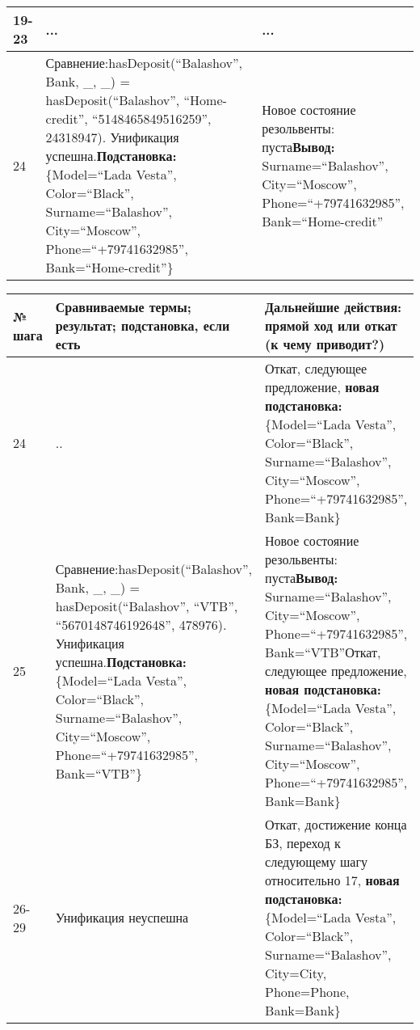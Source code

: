 \documentclass[14pt,a4paper]{scrreprt}
\begin{document}
\begin{enumerate}
\begin{table}[H]
\begin{tabular}{|p{1.2cm\small}|p{9cm\small}|p{5cm\small}|}
		\hline
		19-23 & ... & ...\\
		\hline
		24 & Сравнение:\linebreak hasDeposit(``Balashov'', Bank, \_, \_) = hasDeposit(``Balashov'', ``Home-credit'', ``5148465849516259'', 24318947). Унификация успешна.\linebreak \textbf{Подстановка:} \{Model=``Lada Vesta'', Color=``Black'', Surname=``Balashov'', City=``Moscow'', Phone=``+79741632985'', Bank=``Home-credit''\} & Новое состояние резольвенты: пуста\linebreak \textbf{Вывод:} Surname=``Balashov'', City=``Moscow'', Phone=``+79741632985'', Bank=``Home-credit''\\
		\hline
	\end{tabular}
\end{table}

\begin{table}[H]
	\centering
	\begin{tabular}{|p{1.2cm\small}|p{9cm\small}|p{5cm\small}|}
		\hline
		№ шага & Сравниваемые термы; результат; подстановка, если есть & Дальнейшие действия: прямой ход или откат (к чему приводит?)\\
		\hline
		24 & .. & Откат, следующее предложение, \textbf{новая подстановка:} \{Model=``Lada Vesta'', Color=``Black'', Surname=``Balashov'', City=``Moscow'', Phone=``+79741632985'', Bank=Bank\}\\
		\hline
		25 & Сравнение:\linebreak hasDeposit(``Balashov'', Bank, \_, \_) = hasDeposit(``Balashov'', ``VTB'', ``5670148746192648'', 478976). Унификация успешна.\linebreak \textbf{Подстановка:} \{Model=``Lada Vesta'', Color=``Black'', Surname=``Balashov'', City=``Moscow'', Phone=``+79741632985'', Bank=``VTB''\} & Новое состояние резольвенты: пуста\linebreak \textbf{Вывод:} Surname=``Balashov'', City=``Moscow'', Phone=``+79741632985'', Bank=``VTB''\linebreak Откат, следующее предложение, \textbf{новая подстановка:} \{Model=``Lada Vesta'', Color=``Black'', Surname=``Balashov'', City=``Moscow'', Phone=``+79741632985'', Bank=Bank\}\\
		\hline
		26-29 & Унификация неуспешна & Откат, достижение конца БЗ, переход к следующему шагу относительно 17, \textbf{новая подстановка:} \{Model=``Lada Vesta'', Color=``Black'', Surname=``Balashov'', City=City, Phone=Phone, Bank=Bank\}\\
		\hline
	\end{tabular}
\end{table}
	

\end{enumerate}
\end{document}
